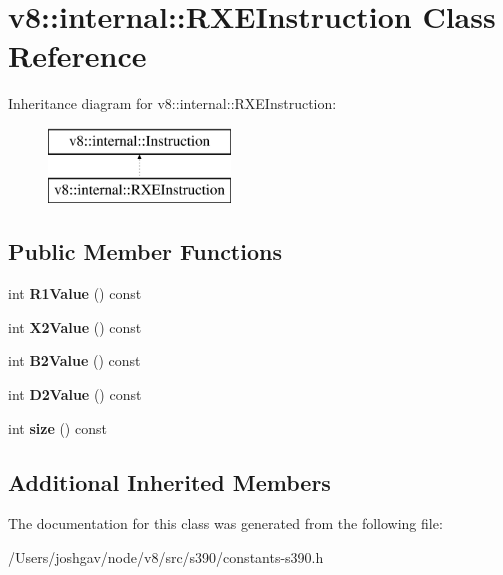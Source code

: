 \hypertarget{classv8_1_1internal_1_1_r_x_e_instruction}{}\section{v8\+:\+:internal\+:\+:R\+X\+E\+Instruction Class Reference}
\label{classv8_1_1internal_1_1_r_x_e_instruction}
Inheritance diagram for v8\+:\+:internal\+:\+:R\+X\+E\+Instruction\+:\begin{figure}[H]
\begin{center}
\leavevmode
\includegraphics[height=2.000000cm]{classv8_1_1internal_1_1_r_x_e_instruction}
\end{center}
\end{figure}
\subsection*{Public Member Functions}
\begin{DoxyCompactItemize}
\item 
int {\bfseries R1\+Value} () const \hypertarget{classv8_1_1internal_1_1_r_x_e_instruction_a5f5dcd94fa439aeaa7e37be864e66c91}{}\label{classv8_1_1internal_1_1_r_x_e_instruction_a5f5dcd94fa439aeaa7e37be864e66c91}

\item 
int {\bfseries X2\+Value} () const \hypertarget{classv8_1_1internal_1_1_r_x_e_instruction_a73db6c44fb0c47bfd465baadb326a97c}{}\label{classv8_1_1internal_1_1_r_x_e_instruction_a73db6c44fb0c47bfd465baadb326a97c}

\item 
int {\bfseries B2\+Value} () const \hypertarget{classv8_1_1internal_1_1_r_x_e_instruction_ad86268de0bdc8ac50397f4e4f619a94c}{}\label{classv8_1_1internal_1_1_r_x_e_instruction_ad86268de0bdc8ac50397f4e4f619a94c}

\item 
int {\bfseries D2\+Value} () const \hypertarget{classv8_1_1internal_1_1_r_x_e_instruction_a9029926c9f81f85dcbf3fa3cd9dbc565}{}\label{classv8_1_1internal_1_1_r_x_e_instruction_a9029926c9f81f85dcbf3fa3cd9dbc565}

\item 
int {\bfseries size} () const \hypertarget{classv8_1_1internal_1_1_r_x_e_instruction_aea5c0c56bf33efa29f3b5c3e3b63ae2b}{}\label{classv8_1_1internal_1_1_r_x_e_instruction_aea5c0c56bf33efa29f3b5c3e3b63ae2b}

\end{DoxyCompactItemize}
\subsection*{Additional Inherited Members}


The documentation for this class was generated from the following file\+:\begin{DoxyCompactItemize}
\item 
/\+Users/joshgav/node/v8/src/s390/constants-\/s390.\+h\end{DoxyCompactItemize}
